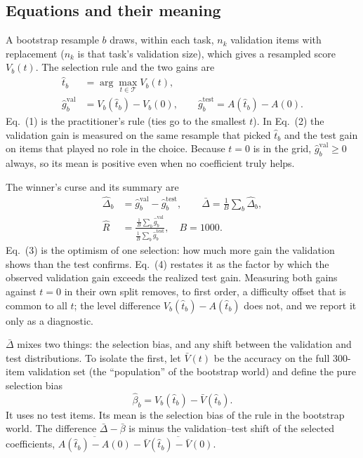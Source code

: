 \documentclass[conference]{IEEEtran}
\begin{document}
\subsection*{Equations and their meaning}
A bootstrap resample $b$ draws, within each task, $n_k$ validation items with replacement ($n_k$ is that task's validation size), which gives a resampled score $V_b(t)$. The selection rule and the two gains are
\begin{align}
\hat t_b&=\arg\max_{t\in\mathcal{T}} V_b(t),\\
\hat g^{\mathrm{val}}_b&=V_b(\hat t_b)-V_b(0),\qquad
\hat g^{\mathrm{test}}_b=A(\hat t_b)-A(0).
\end{align}
Eq.~(1) is the practitioner's rule (ties go to the smallest $t$). In Eq.~(2) the validation gain is measured on the same resample that picked $\hat t_b$ and the test gain on items that played no role in the choice. Because $t=0$ is in the grid, $\hat g^{\mathrm{val}}_b\ge 0$ always, so its mean is positive even when no coefficient truly helps.

The winner's curse and its summary are
\begin{align}
\hat\Delta_b&=\hat g^{\mathrm{val}}_b-\hat g^{\mathrm{test}}_b,\qquad
\bar\Delta=\tfrac1B\sum_b\hat\Delta_b,\\
\hat R&=\frac{\tfrac1B\sum_b\hat g^{\mathrm{val}}_b}{\tfrac1B\sum_b\hat g^{\mathrm{test}}_b},\quad B=1000.
\end{align}
Eq.~(3) is the optimism of one selection: how much more gain the validation shows than the test confirms. Eq.~(4) restates it as the factor by which the observed validation gain exceeds the realized test gain. Measuring both gains against $t=0$ in their own split removes, to first order, a difficulty offset that is common to all $t$; the level difference $V_b(\hat t_b)-A(\hat t_b)$ does not, and we report it only as a diagnostic.

$\bar\Delta$ mixes two things: the selection bias, and any shift between the validation and test distributions. To isolate the first, let $\bar V(t)$ be the accuracy on the full 300-item validation set (the ``population'' of the bootstrap world) and define the pure selection bias
\begin{equation}
\hat\beta_b=V_b(\hat t_b)-\bar V(\hat t_b).
\end{equation}
It uses no test items. Its mean is the selection bias of the rule in the bootstrap world. The difference $\bar\Delta-\bar\beta$ is minus the validation--test shift of the selected coefficients, $\overline{A(\hat t_b)-A(0)}-\overline{\bar V(\hat t_b)-\bar V(0)}$.
\end{document}
